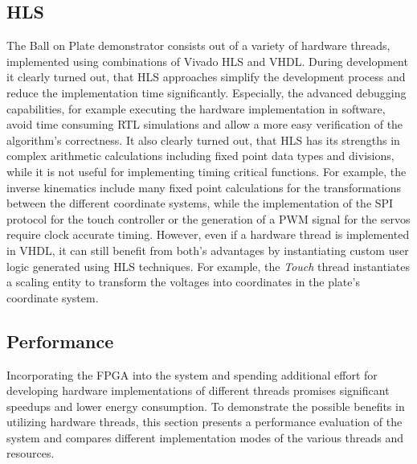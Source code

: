\subsection{\acl{HLS}}
The Ball on Plate demonstrator consists out of a variety of hardware threads,
implemented using combinations of Vivado HLS and \ac{VHDL}. During development
it clearly turned out, that \ac{HLS} approaches simplify the development
process and reduce the implementation time significantly. Especially, the
advanced debugging capabilities, for example executing the hardware
implementation in software, avoid time consuming \ac{RTL} simulations and
allow a more easy verification of the algorithm's correctness. It also clearly
turned out, that \ac{HLS} has its strengths in complex arithmetic calculations
including fixed point data types and divisions, while it is not useful for
implementing timing critical functions. For example, the inverse kinematics
include many fixed point calculations for the transformations between the
different coordinate systems, while the implementation of the \ac{SPI}
protocol for the touch controller or the generation of a \ac{PWM} signal for
the servos require clock accurate timing. However, even if a hardware thread
is implemented in \ac{VHDL}, it can still benefit from both's advantages by
instantiating custom user logic generated using \ac{HLS} techniques. For
example, the \emph{Touch} thread instantiates a scaling entity to transform
the voltages into coordinates in the plate's coordinate system.

\subsection{Performance}
Incorporating the \ac{FPGA} into the system and spending additional effort for
developing hardware implementations of different threads promises significant
speedups and lower energy consumption. To demonstrate the possible benefits in
utilizing hardware threads, this section presents a performance evaluation of
the system and compares different implementation modes of the various threads
and resources.

